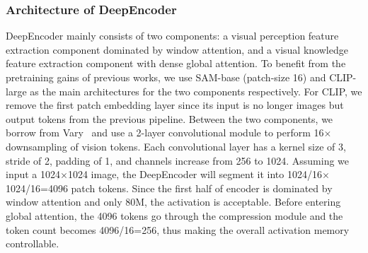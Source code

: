 \documentclass[11pt, a4paper, logo, copyright, nonumbering]{deepseek}
\begin{document}
\begin{CJK*}{UTF8}{gbsn}
\subsubsection{Architecture of DeepEncoder}
DeepEncoder mainly consists of two components: a visual perception feature extraction component dominated by window attention, and a visual knowledge feature extraction component with dense global attention. To benefit from the pretraining gains of previous works, we use SAM-base (patch-size 16) and CLIP-large as the main architectures for the two components respectively. For CLIP, we remove the first patch embedding layer since its input is no longer images but output tokens from the previous pipeline. Between the two components, we borrow from Vary~\cite{wei2024vary} and use a 2-layer convolutional module to perform 16$\times$ downsampling of vision tokens. Each convolutional layer has a kernel size of 3, stride of 2, padding of 1, and channels increase from 256 to 1024. Assuming we input a 1024$\times$1024 image, the DeepEncoder will segment it into 1024/16$\times$1024/16=4096 patch tokens. Since the first half of encoder is dominated by window attention and only 80M, the activation is acceptable. Before entering global attention, the 4096 tokens go through the compression module and the token count becomes 4096/16=256, thus making the overall activation memory controllable.


\begin{table}[!h]\normalsize
	\centering	
        
 	\caption{Multi resolution support of DeepEncoder. For both research and application purposes, we design DeepEncoder with diverse native resolution and dynamic resolution modes.}
    \setlength{\abovecaptionskip}{0.2cm}
\end{table}
\end{CJK*}
\end{document}
